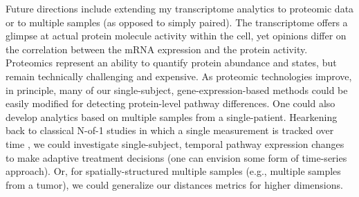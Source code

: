 %

Future directions include extending my transcriptome analytics to proteomic data or to multiple samples (as opposed to simply paired). The transcriptome offers a glimpse at actual protein molecule activity within the cell, yet opinions differ on the correlation between the mRNA expression and the protein activity. Proteomics represent an ability to quantify protein abundance and states, but remain technically challenging and expensive. As proteomic technologies improve, in principle, many of our single-subject, gene-expression-based methods could be easily modified for detecting protein-level pathway differences. One could also develop analytics based on multiple samples from a single-patient. Hearkening back to classical N-of-1 studies in which a single measurement is tracked over time \citep{Nikles2015}, we could investigate single-subject, temporal pathway expression changes to make adaptive treatment decisions (one can envision some form of time-series approach). Or, for spatially-structured multiple samples (e.g., multiple samples from a tumor), we could generalize our distances metrics for higher dimensions.

\nocite{Kitano2002} \nocite{Nakagawa2007}